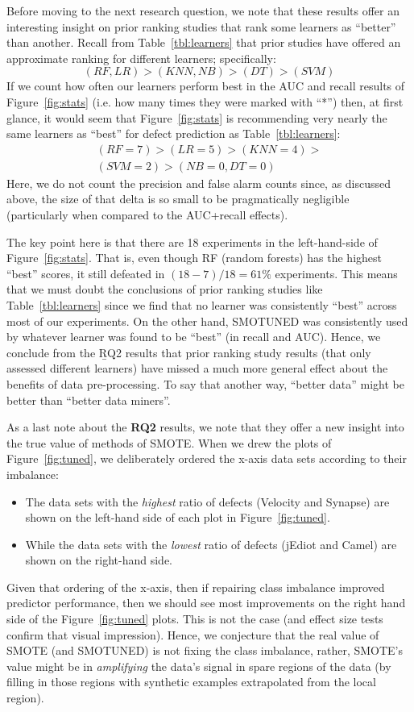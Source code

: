 \documentclass[10pt,conference]{IEEEtran}
\newcommand{\bi}{\begin{itemize}[leftmargin=0.4cm]}
\newcommand{\ei}{\end{itemize}}
\theoremstyle{break}
\theoremstyle{break}
\newcommand{\sma}{{\sc SMOTE}}
\newcommand{\smb}{{\sc SMOTUNED}}
\begin{document}
Before moving to the next research question, we note that these
 results offer an interesting insight on prior ranking studies that rank some learners
as ``better'' than another.
Recall from Table~\ref{tbl:learners} that prior studies have offered an approximate ranking for different learners; specifically:
\[
(\mathit{RF},\mathit{LR}) > (\mathit{KNN},\mathit{NB}) > (\mathit{DT}) > (\mathit{SVM})
\]
If we count how often our learners perform
best in the AUC and recall results of Figure~\ref{fig:stats} (i.e. how many times they were marked with ``*'') then, at first
glance, it would seem that Figure~\ref{fig:stats} is recommending very nearly the same
learners as ``best'' for defect prediction as   Table~\ref{tbl:learners}:
\[
\begin{array}{c}
(\mathit{RF}=7) > (\mathit{LR}=5) > (\mathit{KNN}=4) >\\
(\mathit{SVM}=2) > (\mathit{NB}=0, \mathit{DT}=0)
\end{array}
\]
Here, we do not count  the precision and false alarm counts since, as discussed above, the size
of that delta is so small to be pragmatically negligible (particularly when compared to the AUC+recall effects).

The key point here is that there are 18 experiments in the left-hand-side of Figure~\ref{fig:stats}. That is,
even though RF (random forests) has the highest  ``best'' scores, it still defeated in \mbox{$(18-7)/18=61\%$}
experiments. This means that we must doubt the conclusions of prior ranking studies like 
 Table~\ref{tbl:learners} since we find that no   learner was  consistently  ``best''  across most of our experiments.
On the other hand, 
  {\smb} was  consistently  used  by  whatever  learner  was  found  to  be ``best'' (in recall and AUC). 
Hence, we conclude from the {\b RQ2} results that  prior ranking study results (that only assessed different learners) have missed a much more general effect about the benefits of data pre-processing.
To say that another way, ``better data'' might be better than ``better data miners''.

As a last note about the {\bf RQ2} results, we note that they offer a new insight into
the true value of methods of {\sma}.
When we drew the plots of  Figure~\ref{fig:tuned}, we deliberately ordered
the x-axis data sets according to their imbalance:
\bi
\item
The data sets with the {\em highest} ratio of defects (Velocity and Synapse) are shown on the left-hand side of each plot in Figure~\ref{fig:tuned}.
\item
While the data sets with the {\em lowest} ratio of defects (jEdiot and Camel) are shown on the right-hand side.
\ei
Given that ordering of the x-axis, then if  repairing class imbalance  improved predictor performance, then 
we should see most improvements on the right hand side of the  Figure~\ref{fig:tuned} plots.
This is not the case (and effect size tests confirm that visual impression).
Hence, we conjecture that the   real value of {\sma} (and {\smb}) is not fixing the class imbalance, rather, SMOTE's
value might be in {\em amplifying} the data's signal in spare regions of the data (by filling
in those regions with synthetic examples extrapolated from the local region). 
\end{document}
